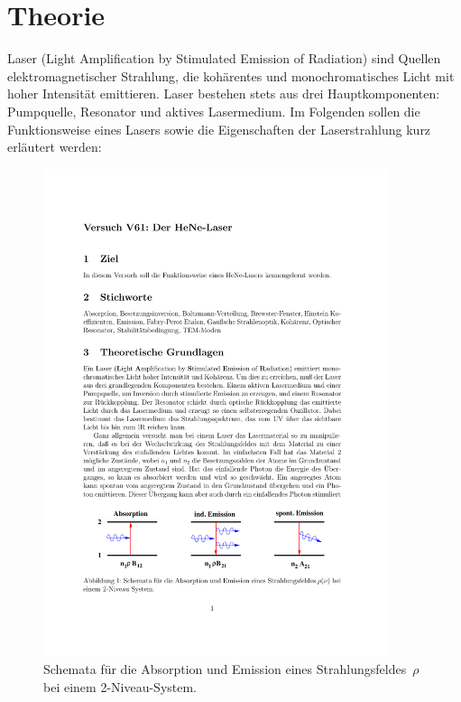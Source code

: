 \section{Theorie}
\label{sec:theorie}

Laser (Light Amplification by Stimulated Emission of Radiation) sind Quellen
elektromagnetischer Strahlung, die kohärentes und monochromatisches Licht mit
hoher Intensität emittieren. Laser bestehen stets aus drei Hauptkomponenten:
Pumpquelle, Resonator und aktives Lasermedium. Im Folgenden sollen die
Funktionsweise eines Lasers sowie die Eigenschaften der Laserstrahlung kurz
erläutert werden:

\begin{figure}[htb]
  \centering
  \includegraphics[width=0.9\textwidth]{figures/fig_Übergänge.pdf}
  \caption{Schemata für die Absorption und Emission eines
  Strahlungsfeldes~$\rho$ bei einem \num{2}-Niveau-System.}
  \label{fig:Übergänge}
\end{figure}


